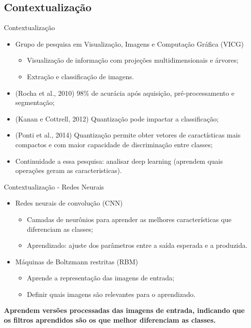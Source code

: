 \documentclass{beamer}
\begin{document}
\subsection{Contextualização}
\begin{frame}{Contextualização}
  \begin{itemize}
    \item Grupo de pesquisa em Visualização, Imagens e Computação Gráfica (VICG)
    \begin{itemize}
        \item Visualização de informação com projeções multidimensionais e árvores;
        \item Extração e classificação de imagens.
    \end{itemize}
    \item (Rocha et al., 2010) 98\% de acurácia após aquisição, pré-processamento e segmentação; %
    \item (Kanan e Cottrell, 2012) Quantização pode impactar a classificação;
    \item (Ponti et al., 2014) Quantização permite obter vetores de caractísticas mais compactos e com maior capacidade de discriminação entre classes;
    \item Continuidade a essa pesquisa: analisar deep learning (aprendem quais operações geram as caracteristicas).
  \end{itemize}
\end{frame}
\begin{frame}{Contextualização - Redes Neurais}
\justifying
  \begin{itemize}
    \item Redes neurais de convolução (CNN)
    \begin{itemize}
        \item Camadas de neurônios para aprender as melhores características que diferenciam as classes;
        \item Aprendizado: ajuste dos parâmetros entre a saída esperada e a produzida.
    \end{itemize}
    \item Máquinas de Boltzmann restritas (RBM)
    \begin{itemize}
        \item Aprende a representação das imagens de entrada;
        \item Definir quais imagens são relevantes para o aprendizado.
    \end{itemize}
  \end{itemize}
 \textbf{Aprendem versões processadas das imagens de entrada, indicando que os filtros aprendidos são os que melhor diferenciam as classes.}
\end{frame}
\end{document}
